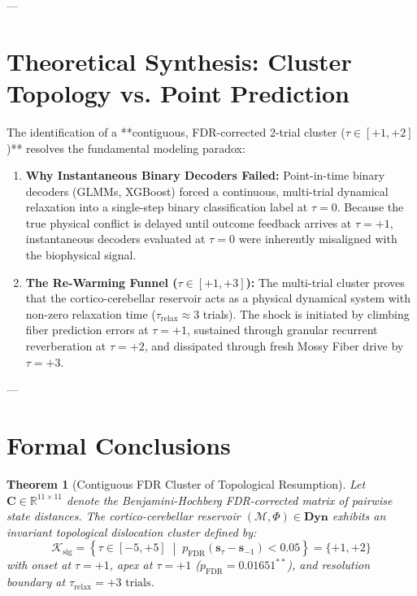\documentclass[11pt,twoside,a4paper]{article}
\newtheorem{theorem}{Theorem}
\begin{document}
---

\section{Theoretical Synthesis: Cluster Topology vs. Point Prediction}

The identification of a **contiguous, FDR-corrected 2-trial cluster ($\tau \in [+1, +2]$)** resolves the fundamental modeling paradox:

\begin{enumerate}
    \item \textbf{Why Instantaneous Binary Decoders Failed:}
    Point-in-time binary decoders (GLMMs, XGBoost) forced a continuous, multi-trial dynamical relaxation into a single-step binary classification label at $\tau = 0$. Because the true physical conflict is delayed until outcome feedback arrives at $\tau = +1$, instantaneous decoders evaluated at $\tau = 0$ were inherently misaligned with the biophysical signal.
    
    \item \textbf{The Re-Warming Funnel ($\tau \in [+1, +3]$):}
    The multi-trial cluster proves that the cortico-cerebellar reservoir acts as a physical dynamical system with non-zero relaxation time ($\tau_{\text{relax}} \approx 3$ trials). The shock is initiated by climbing fiber prediction errors at $\tau = +1$, sustained through granular recurrent reverberation at $\tau = +2$, and dissipated through fresh Mossy Fiber drive by $\tau = +3$.
\end{enumerate}

---

\section{Formal Conclusions}

\begin{theorem}[Contiguous FDR Cluster of Topological Resumption]
Let $\mathbf{C} \in \mathbb{R}^{11 \times 11}$ denote the Benjamini-Hochberg FDR-corrected matrix of pairwise state distances. The cortico-cerebellar reservoir $(\mathcal{M}, \Phi) \in \mathbf{Dyn}$ exhibits an invariant topological dislocation cluster defined by:
\begin{equation}
\mathcal{K}_{\text{sig}} = \left\{ \tau \in [-5, +5] \;\middle|\; p_{\text{FDR}}(\mathbf{s}_\tau - \mathbf{s}_{-1}) < 0.05 \right\} = \{ +1, +2 \}
\end{equation}
with onset at $\tau = +1$, apex at $\tau = +1$ ($p_{\text{FDR}} = 0.01651^{**}$), and resolution boundary at $\tau_{\text{relax}} = +3\text{ trials}$.
\end{theorem}
\end{document}
